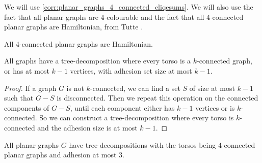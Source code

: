 We will use \cref{corr:planar_graphs_4_connected_cliqesums}. We will also use the fact that all planar graphs are \(4\)-colourable \cite{appelEveryPlanarMap1989} and the fact that all 4-connected planar graphs are Hamiltonian, from Tutte \cite{tutteTheoremPlanarGraphs1956}.

\begin{theorem}\label{thm:4-connected_planar_ham_cycle}
	All 4-connected planar graphs are Hamiltonian.
\end{theorem}

\begin{lemma}\label{lem:clique_sum_connected}
	All graphs have a tree-decomposition where every torso is a \(k\)-connected graph, or has at most $k-1$ vertices, with adhesion set size at most \(k-1\).
\end{lemma}
\begin{proof}
	If a graph \(G\) is not \(k\)-connected, we can find a set \(S\) of size at most \(k-1\) such that \(G - S\) is disconnected. Then we repeat this operation on the connected components of \(G - S\), until each component either has \(k-1\) vertices or is \(k\)-connected. So we can construct a tree-decomposition where every torso is \(k\)-connected and the adhesion size is at most \(k-1\). 
\end{proof}

\begin{corollary}\label{corr:planar_graphs_4_connected_cliqesums}
	All planar graphs \(G\) have tree-decompositions with the torsos being \(4\)-connected planar graphs and adhesion at most \(3\).
\end{corollary}


